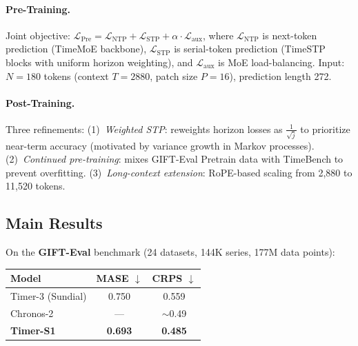 \documentclass[11pt]{article}
\begin{document}
\paragraph{Pre-Training.} Joint objective: $\mathcal{L}_{\text{Pre}} = \mathcal{L}_{\text{NTP}} + \mathcal{L}_{\text{STP}} + \alpha \cdot \mathcal{L}_{\text{aux}}$, where $\mathcal{L}_{\text{NTP}}$ is next-token prediction (TimeMoE backbone), $\mathcal{L}_{\text{STP}}$ is serial-token prediction (TimeSTP blocks with uniform horizon weighting), and $\mathcal{L}_{\text{aux}}$ is MoE load-balancing. Input: $N{=}180$ tokens (context $T{=}2880$, patch size $P{=}16$), prediction length 272.

\paragraph{Post-Training.} Three refinements: (1)~\emph{Weighted STP}: reweights horizon losses as $\frac{1}{\sqrt{j}}$ to prioritize near-term accuracy (motivated by variance growth in Markov processes). (2)~\emph{Continued pre-training}: mixes GIFT-Eval Pretrain data with TimeBench to prevent overfitting. (3)~\emph{Long-context extension}: RoPE-based scaling from 2,880 to 11,520 tokens.

\subsection{Main Results}

On the \textbf{GIFT-Eval} benchmark (24 datasets, 144K series, 177M data points):

\begin{table}[h]
\centering
\begin{tabular}{lcc}
\toprule
\textbf{Model} & \textbf{MASE} $\downarrow$ & \textbf{CRPS} $\downarrow$ \\
\midrule
Timer-3 (Sundial) & 0.750 & 0.559 \\
Chronos-2 & --- & $\sim$0.49 \\
\textbf{Timer-S1} & \textbf{0.693} & \textbf{0.485} \\
\bottomrule
\end{tabular}
\end{table}
\end{document}
